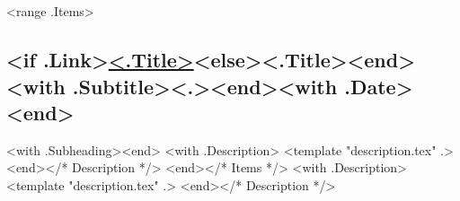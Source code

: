 \section{}
<range .Items>
\subsection{<if .Link>\href{<.Link>}{\textbf{<.Title>}}<else>\textbf{<.Title>}<end>
<with .Subtitle><.><end><with .Date> \hfill {}<end>}
<with .Subheading><end>
<with .Description>
<template "description.tex" .>
<end></* Description */>
<end></* Items */>
<with .Description>
<template "description.tex" .>
<end></* Description */>